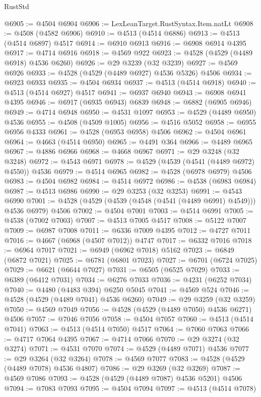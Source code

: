 \begin{lexlean}{RustStd}
\begin{coremodule}
@6905 := @4504 @6904
@6906 := LexLeanTarget.RustSyntax.Item.natLt
@6908 := @4508 (@4582 @6906)
@6910 := @4513 (@4514 @6886)
@6913 := @4513 (@4514 @6897) @4517
@6914 := @6910 @6913
@6916 := @6908 @6914 @4395
@6917 := @4714 @6916
@6918 := @4569 @922
@6923 := @4528 (@4529 (@4489 @6918) @4536 @6260)
@6926 := @29 @3239 (@32 @3239)
@6927 := @4569 @6926
@6933 := @4528 (@4529 (@4489 @6927) @4536 @5326) @4506
@6934 := @6923 @6933
@6935 := @4504 @6934
@6937 := @4513 (@4514 @6918)
@6940 := @4513 (@4514 @6927) @4517
@6941 := @6937 @6940
@6943 := @6908 @6941 @4395
@6946 := @6917 (@6935 @6943) @6839
@6948 := @6882 (@6905 @6946)
@6949 := @4714 @6948
@6950 := @4531 @1097
@6953 := @4529 (@4489 @6950) @4536
@6955 := @4508 (@4509 @1005)
@6956 := @4516 @5052
@6958 := @6955 @6956 @4333
@6961 := @4528 (@6953 @6958) @4506
@6962 := @4504 @6961
@6964 := @4663 (@4514 @6950)
@6965 := @4491 @364
@6966 := @4489 @6965
@6967 := @4886 @6966
@6968 := @4668 @6967
@6971 := @29 @3248 (@32 @3248)
@6972 := @4543 @6971
@6978 := @4529 (@4539 (@4541 (@4489 @6972) @4550)) @4536
@6979 := @4514 @6965
@6982 := @4528 (@6978 @6979) @4506
@6983 := @4504 @6982
@6984 := @4514 @6972
@6986 := @4538 (@6983 @6984)
@6987 := @4513 @6986
@6990 := @29 @3253 (@32 @3253)
@6991 := @4543 @6990
@7001 := @4528 (@4529 (@4539 (@4548 (@4541 (@4489 @6991) @4549))) @4536 @6979) @4506
@7002 := @4504 @7001
@7003 := @4514 @6991
@7005 := @4538 (@7002 @7003)
@7007 := @4513 @7005 @4517
@7008 := @5122 @7007
@7009 := @6987 @7008
@7011 := @6336 @7009 @4395
@7012 := @4727 @7011
@7016 := @4667 (@6968 (@4507 @7012)) @4747
@7017 := @6332 @7016
@7018 := @6964 @7017
@7021 := @6949 (@6962 @7018) @5162
@7023 := @6849 (@6872 @7021)
@7025 := @6781 (@6801 @7023)
@7027 := @6701 (@6724 @7025)
@7029 := @6621 (@6644 @7027)
@7031 := @6505 (@6525 @7029)
@7033 := @6389 (@6412 @7031)
@7034 := @6276 @7033
@7036 := @4231 (@6252 @7034)
@7040 := @4480 (@4483 @394) @6250 @5045
@7041 := @4569 @524
@7046 := @4528 (@4529 (@4489 @7041) @4536 @6260)
@7049 := @29 @3259 (@32 @3259)
@7050 := @4569 @7049
@7056 := @4528 (@4529 (@4489 @7050) @4536 @6271) @4506
@7057 := @7046 @7056
@7058 := @4504 @7057
@7060 := @4513 (@4514 @7041)
@7063 := @4513 (@4514 @7050) @4517
@7064 := @7060 @7063
@7066 := @4717 @7064 @4395
@7067 := @4714 @7066
@7070 := @29 @3274 (@32 @3274)
@7071 := @4531 @7070
@7074 := @4529 (@4489 @7071) @4536
@7077 := @29 @3264 (@32 @3264)
@7078 := @4569 @7077
@7083 := @4528 (@4529 (@4489 @7078) @4536 @4807)
@7086 := @29 @3269 (@32 @3269)
@7087 := @4569 @7086
@7093 := @4528 (@4529 (@4489 @7087) @4536 @5201) @4506
@7094 := @7083 @7093
@7095 := @4504 @7094
@7097 := @4513 (@4514 @7078)

\end{coremodule}
\end{lexlean}
